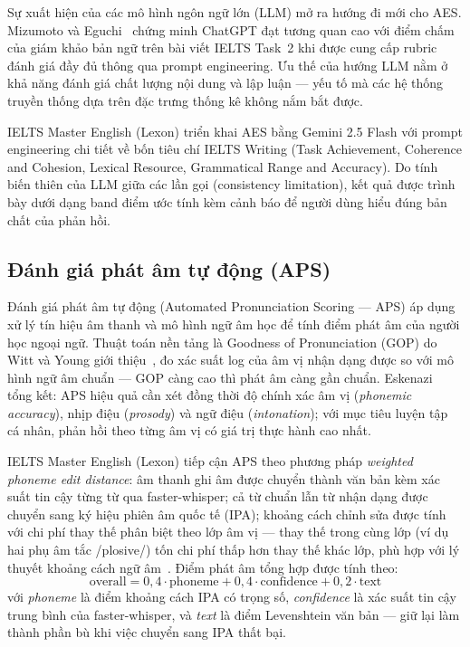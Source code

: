 Sự xuất hiện của các mô hình ngôn ngữ lớn (LLM) mở ra hướng đi mới cho AES. Mizumoto và Eguchi~\cite{mizumoto2023exploring} chứng minh ChatGPT đạt tương quan cao với điểm chấm của giám khảo bản ngữ trên bài viết IELTS Task~2 khi được cung cấp rubric đánh giá đầy đủ thông qua prompt engineering. Ưu thế của hướng LLM nằm ở khả năng đánh giá chất lượng nội dung và lập luận --- yếu tố mà các hệ thống truyền thống dựa trên đặc trưng thống kê không nắm bắt được.

IELTS Master English (Lexon) triển khai AES bằng Gemini 2.5 Flash với prompt engineering chi tiết về bốn tiêu chí IELTS Writing (Task Achievement, Coherence and Cohesion, Lexical Resource, Grammatical Range and Accuracy). Do tính biến thiên của LLM giữa các lần gọi (consistency limitation), kết quả được trình bày dưới dạng band điểm ước tính kèm cảnh báo để người dùng hiểu đúng bản chất của phản hồi.

\subsection{Đánh giá phát âm tự động (APS)}

Đánh giá phát âm tự động (Automated Pronunciation Scoring --- APS) áp dụng xử lý tín hiệu âm thanh và mô hình ngữ âm học để tính điểm phát âm của người học ngoại ngữ. Thuật toán nền tảng là Goodness of Pronunciation (GOP) do Witt và Young giới thiệu~\cite{witt2000phone}, đo xác suất log của âm vị nhận dạng được so với mô hình ngữ âm chuẩn --- GOP càng cao thì phát âm càng gần chuẩn. Eskenazi~\cite{eskenazi2009overview} tổng kết: APS hiệu quả cần xét đồng thời độ chính xác âm vị (\textit{phonemic accuracy}), nhịp điệu (\textit{prosody}) và ngữ điệu (\textit{intonation}); với mục tiêu luyện tập cá nhân, phản hồi theo từng âm vị có giá trị thực hành cao nhất.

IELTS Master English (Lexon) tiếp cận APS theo phương pháp \textit{weighted phoneme edit distance}: âm thanh ghi âm được chuyển thành văn bản kèm xác suất tin cậy từng từ qua faster-whisper; cả từ chuẩn lẫn từ nhận dạng được chuyển sang ký hiệu phiên âm quốc tế (IPA); khoảng cách chỉnh sửa được tính với chi phí thay thế phân biệt theo lớp âm vị --- thay thế trong cùng lớp (ví dụ hai phụ âm tắc /plosive/) tốn chi phí thấp hơn thay thế khác lớp, phù hợp với lý thuyết khoảng cách ngữ âm~\cite{witt2000phone}. Điểm phát âm tổng hợp được tính theo:
\begin{equation}
  \text{overall} = 0{,}4 \cdot \text{phoneme} + 0{,}4 \cdot \text{confidence} + 0{,}2 \cdot \text{text}
  \label{eq:aps-score}
\end{equation}
với \textit{phoneme} là điểm khoảng cách IPA có trọng số, \textit{confidence} là xác suất tin cậy trung bình của faster-whisper, và \textit{text} là điểm Levenshtein văn bản --- giữ lại làm thành phần bù khi việc chuyển sang IPA thất bại.

